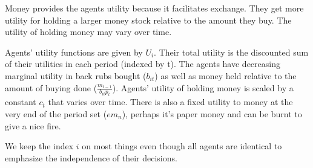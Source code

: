 \documentclass[14pt]{article} \usepackage{amsmath}
\begin{document}
Money provides the agents utility because it facilitates exchange. They get more utility for holding a larger money stock relative to the amount they buy. The utility of holding money may vary over time.

Agents' utility functions are given by $U_i$. Their total utility is the discounted sum of their utilities in each period (indexed by t). The agents have decreasing marginal utility in back rubs bought ($b_{it}$) as well as money held relative to the amount of buying done ($\frac{m_{t-1}}{b_{it} p_t}$). Agents' utility of holding money is scaled by a constant $c_t$ that varies over time.  There is also a fixed utility to money at the very end of the period set ($e m_n$), perhaps it's paper money and can be burnt to give a nice fire.

We keep the index $i$ on most things even though all agents are identical to emphasize the independence of their decisions. 
\end{document}
